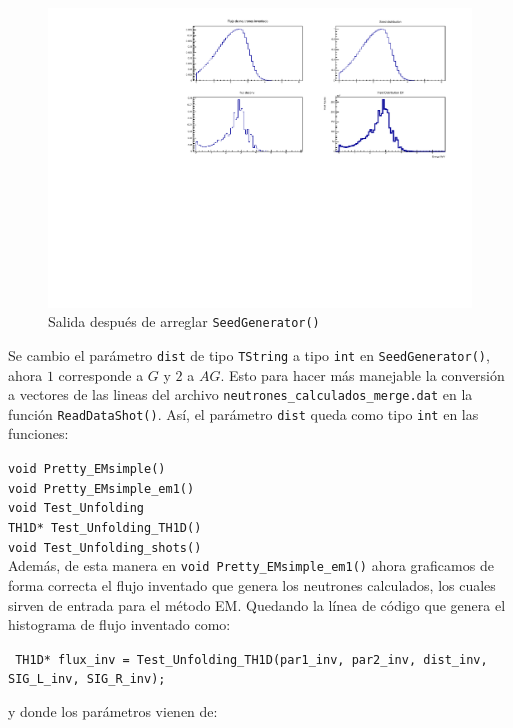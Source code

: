 \documentclass[11pt,letterpaper]{article}
\begin{document}
\begin{figure}[H]
    \includegraphics[width=1\textwidth]{img/despues_de_arreglar_Seed.pdf}
    \centering
     \cprotect\caption{Salida después de arreglar \verb|SeedGenerator()| }
\end{figure}

Se cambio el parámetro \verb|dist| de tipo \verb|TString| a tipo \verb|int| en \verb|SeedGenerator()|, ahora $1$ corresponde a $G$ y $2$ a $AG$. Esto para hacer más manejable la conversión a vectores de las lineas del archivo \verb|neutrones_calculados_merge.dat| en la función \verb|ReadDataShot()|. Así, el parámetro \verb|dist| queda como tipo \verb|int| en las funciones:

\verb|void Pretty_EMsimple()|\\
\verb|void Pretty_EMsimple_em1()|\\
\verb|void Test_Unfolding| \\
\verb|TH1D* Test_Unfolding_TH1D()| \\
\verb|void Test_Unfolding_shots()|\\

Además, de esta manera en \verb|void Pretty_EMsimple_em1()|  ahora graficamos de forma correcta el flujo inventado que genera los neutrones calculados, los cuales sirven de entrada para el método EM.
Quedando la línea de código que genera el histograma de flujo inventado como:

\verb| TH1D* flux_inv = Test_Unfolding_TH1D(par1_inv, par2_inv, dist_inv, SIG_L_inv, SIG_R_inv);|

y donde los parámetros vienen de:
\end{document}
